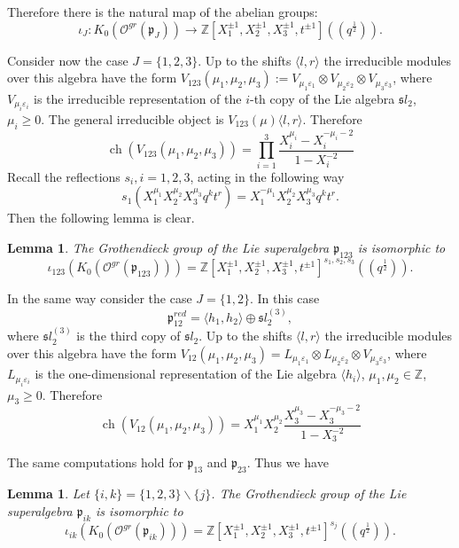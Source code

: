 \documentclass[10pt]{amsart}
\newcommand{\sh}[2]{\langle #1,#2\rangle}
\newtheorem{lemma}[theorem]{Lemma}
\newcommand{\fsl}{{\mathfrak sl}}
\newcommand{\fp}{{\mathfrak p}}
\DeclareMathOperator{\ch}{ch}
\begin{document}
	Therefore there is the natural map of the abelian groups:
	\begin{equation*}
		\iota_{J}:K_0(\mathcal{O}^{gr}(\fp_{J})) \rightarrow \mathbb{Z}[X_1^{\pm 1},X_2^{\pm 1},X_3^{\pm 1},t^{\pm 1}]((q^{\frac{1}{2}})).
	\end{equation*}
	
	Consider now the case $J=\{1,2,3\}$.
	Up to the shifts $\sh{l}{r}$ the irreducible modules over this algebra have the form $V_{123}(\mu_1,\mu_2,\mu_3):=V_{\mu_1 \varepsilon_1} \otimes V_{\mu_2 \varepsilon_2} \otimes V_{\mu_3 \varepsilon_3}$, where $V_{\mu_i \varepsilon_i}$ is the irreducible representation of the $i$-th copy of the Lie algebra $\fsl_2$, $\mu_i\geq 0$. The general irreducible object is $V_{123}(\mu)\sh{l}{r}$. Therefore
	\begin{equation}\label{eq:character3Irreducible}
		\ch(V_{123}(\mu_1,\mu_2,\mu_3))= \prod_{i=1}^3 \frac{X_i^{\mu_i}-X_i^{-\mu_i-2}}{1-X_i^{-2}}
	\end{equation} 
	Recall the reflections $s_i, i=1,2,3$, acting in the following way
	\[s_1(X_1^{\mu_1}X_2^{\mu_2}X_3^{\mu_3}q^kt^r)=X_1^{-\mu_1}X_2^{\mu_2}X_3^{\mu_3}q^kt^r.\]
	Then the following lemma is clear.
	\begin{lemma}
		The Grothendieck group of the Lie superalgebra $\fp_{123}$ is isomorphic to
		\[\iota_{123}(K_0(\mathcal{O}^{gr}(\fp_{123})))=\mathbb{Z}[X_1^{\pm 1},X_2^{\pm 1},X_3^{\pm 1},t^{\pm 1}]^{s_1,s_2,s_3}((q^{\frac{1}{2}})).\]
	\end{lemma}
	
	In the same way consider the case $J=\{1,2\}$. In this case
	\[\fp_{12}^{red}=\langle h_1,h_2 \rangle \oplus \fsl_2^{(3)},\]
	where $\fsl_2^{(3)}$ is the third copy of $\fsl_2$.
	Up to the shifts $\sh{l}{r}$ the irreducible modules over this algebra have the form $V_{12}(\mu_1,\mu_2,\mu_3)=L_{\mu_1 \varepsilon_1}\otimes L_{\mu_2 \varepsilon_2}\otimes V_{\mu_3 \varepsilon_3}$, where $L_{\mu_i \varepsilon_i}$ is the one-dimensional representation of the Lie algebra $\langle h_i \rangle$, $\mu_1,\mu_2 \in \mathbb{Z}$, $\mu_3\geq 0$. Therefore
	\begin{equation*}
		\ch(V_{12}(\mu_1,\mu_2,\mu_3))= X_1^{\mu_1}X_2^{\mu_2} \frac{X_3^{\mu_3}-X_3^{-\mu_3-2}}{1-X_3^{-2}}
	\end{equation*} 
	
	The same computations hold for $\fp_{13}$ and $\fp_{23}$. Thus we have
	\begin{lemma}
		Let $\{i,k\}=\{1,2,3\}\backslash \{j\}$. The Grothendieck group of the Lie superalgebra $\fp_{ik}$ is isomorphic to
		\[\iota_{ik}(K_0(\mathcal{O}^{gr}(\fp_{ik})))=\mathbb{Z}[X_1^{\pm 1},X_2^{\pm 1},X_3^{\pm 1},t^{\pm 1}]^{s_j}((q^{\frac{1}{2}})).\]
	\end{lemma}
	
\end{document}
